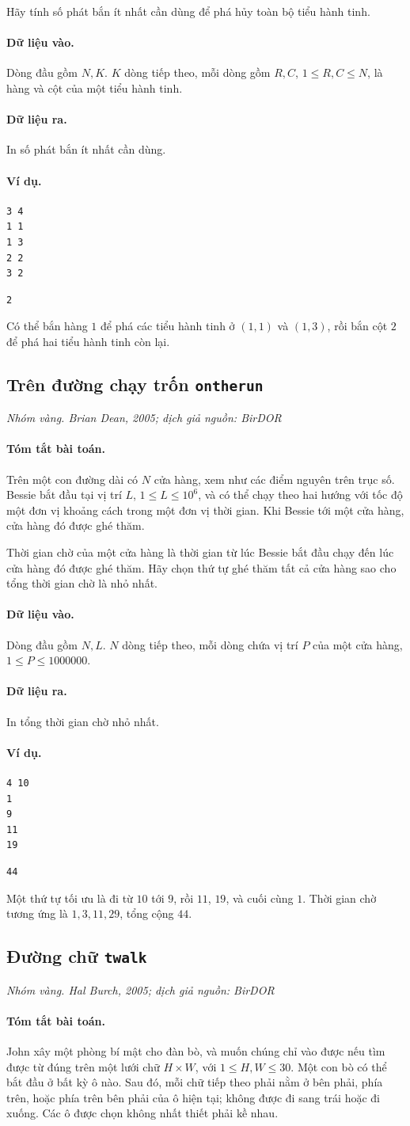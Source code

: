 \documentclass[11pt]{article}
\newcommand{\problem}[4]{%
  \subsection[#1 (#2)]{#1 \hfill {\normalsize\texttt{#2}}}%
  \noindent\textit{#3. #4}\par\smallskip
}
\newcommand{\iosec}[1]{\paragraph{#1}}
\begin{document}
Hãy tính số phát bắn ít nhất cần dùng để phá hủy toàn bộ tiểu hành tinh.

\iosec{Dữ liệu vào.}
Dòng đầu gồm \(N,K\). \(K\) dòng tiếp theo, mỗi dòng gồm \(R,C\),
\(1\le R,C\le N\), là hàng và cột của một tiểu hành tinh.

\iosec{Dữ liệu ra.}
In số phát bắn ít nhất cần dùng.

\iosec{Ví dụ.}
\begin{verbatim}
3 4
1 1
1 3
2 2
3 2
\end{verbatim}

\begin{verbatim}
2
\end{verbatim}

Có thể bắn hàng \(1\) để phá các tiểu hành tinh ở \((1,1)\) và \((1,3)\), rồi
bắn cột \(2\) để phá hai tiểu hành tinh còn lại.

\problem{Trên đường chạy trốn}{ontherun}{Nhóm vàng}{Brian Dean, 2005; dịch giả nguồn: BirDOR}

\iosec{Tóm tắt bài toán.}
Trên một con đường dài có \(N\) cửa hàng, xem như các điểm nguyên trên trục
số. Bessie bắt đầu tại vị trí \(L\), \(1\le L\le 10^6\), và có thể chạy theo
hai hướng với tốc độ một đơn vị khoảng cách trong một đơn vị thời gian. Khi
Bessie tới một cửa hàng, cửa hàng đó được ghé thăm.

Thời gian chờ của một cửa hàng là thời gian từ lúc Bessie bắt đầu chạy đến
lúc cửa hàng đó được ghé thăm. Hãy chọn thứ tự ghé thăm tất cả cửa hàng sao
cho tổng thời gian chờ là nhỏ nhất.

\iosec{Dữ liệu vào.}
Dòng đầu gồm \(N,L\). \(N\) dòng tiếp theo, mỗi dòng chứa vị trí \(P\) của
một cửa hàng, \(1\le P\le 1000000\).

\iosec{Dữ liệu ra.}
In tổng thời gian chờ nhỏ nhất.

\iosec{Ví dụ.}
\begin{verbatim}
4 10
1
9
11
19
\end{verbatim}

\begin{verbatim}
44
\end{verbatim}

Một thứ tự tối ưu là đi từ \(10\) tới \(9\), rồi \(11\), \(19\), và cuối cùng
\(1\). Thời gian chờ tương ứng là \(1,3,11,29\), tổng cộng \(44\).

\problem{Đường chữ}{twalk}{Nhóm vàng}{Hal Burch, 2005; dịch giả nguồn: BirDOR}

\iosec{Tóm tắt bài toán.}
John xây một phòng bí mật cho đàn bò, và muốn chúng chỉ vào được nếu tìm được
từ đúng trên một lưới chữ \(H\times W\), với \(1\le H,W\le 30\). Một con bò
có thể bắt đầu ở bất kỳ ô nào. Sau đó, mỗi chữ tiếp theo phải nằm ở bên phải,
phía trên, hoặc phía trên bên phải của ô hiện tại; không được đi sang trái
hoặc đi xuống. Các ô được chọn không nhất thiết phải kề nhau.
\end{document}
